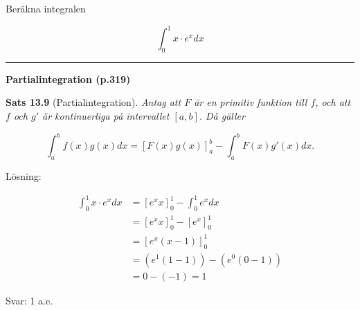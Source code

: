 \documentclass[11pt]{article}
\begin{document}
Beräkna integralen

\[
    \int_0^1 x \cdot e^x dx
\]

\noindent\rule{\textwidth}{0.5pt}

\textbf{Partialintegration (p.319)}

\textbf{Sats 13.9} (Partialintegration). \textit{Antag att $F$ är en primitiv funktion till $f$, och att $f$ och $g'$ är kontinuerliga på intervallet $[a, b]$. Då gäller}

\begin{equation*}
    \int_a^b{f(x)g(x)}dx = \left [F(x)g(x)\right ]_a^b - \int_a^b{F(x)g'(x)}dx.
\end{equation*}

Lösning:

\begin{align*}
    \int_{0}^{1} x \cdot e^{x} dx &= \left[e^{x} x\right]_0^1 - \int_0^1 e^{x} dx \\
    &= \left[e^{x} x\right]_0^1 - \left[ e^x \right]_0^1 \\
    &= \left[e^x(x - 1)\right]_0^1 \\
    &= (e^1(1 - 1)) - (e^0(0 - 1)) \\
    &= 0 - (-1) = 1
\end{align*}

Svar: 1 a.e.
\end{document}
